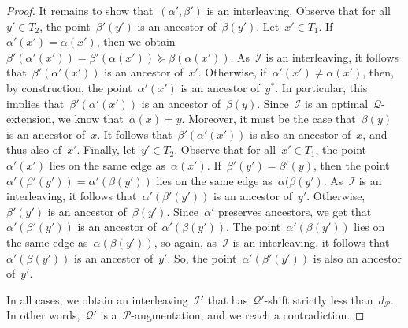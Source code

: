 \documentclass[a4paper,UKenglish, autoref, thm-restate, cleveref]{lipics-v2021}
\newcommand{\resdist}[1]{d_{#1}}
\newcommand{\I}{\mathcal{I}}
\renewcommand{\P}{\mathcal{P}}
\newcommand{\Q}{\mathcal{Q}}
\newcommand{\enumit}[1]{\textcolor{darkgray}{\sffamily\bfseries\upshape\mathversion{bold}#1}}
\begin{document}
\begin{proof}
    It remains to show that~$(\alpha',\beta')$ is an interleaving.
    Observe that for all~$y' \in T_2$, the point~$\beta'(y')$ is an ancestor of~$\beta(y')$. 
    Let~$x' \in T_1$.
    If~$\alpha'(x') = \alpha(x')$, then we obtain~$\beta'(\alpha'(x')) = \beta'(\alpha(x')) \succeq \beta(\alpha(x'))$.
    As~$\I$ is an interleaving, it follows that~$\beta'(\alpha'(x'))$ is an ancestor of~$x'$.
    Otherwise, if~$\alpha'(x') \neq \alpha(x')$, then, by construction, the point~$\alpha'(x')$ is an ancestor of~$y^*$.
    In particular, this implies that~$\beta'(\alpha'(x'))$ is an ancestor of~$\beta(y)$.
    Since~$\I$ is an optimal~$\Q$-extension, we know that~$\alpha(x) = y$.
    Moreover, it must be the case that~$\beta(y)$ is an ancestor of~$x$.
    It follows that~$\beta'(\alpha'(x'))$ is also an ancestor of~$x$, and thus also of~$x'$.    
    Finally, let~$y' \in T_2$.
    Observe that for all~$x' \in T_1$, the point~$\alpha'(x')$ lies on the same edge as~$\alpha(x')$.
    If~$\beta'(y') = \beta'(y)$, then the point~$\alpha'(\beta'(y')) = \alpha'(\beta(y'))$ lies on the same edge as~$\alpha(\beta(y')$.
    As~$\I$ is an interleaving, it follows that~$\alpha'(\beta'(y'))$ is an ancestor of~$y'$.
    Otherwise,~$\beta'(y')$ is an ancestor of~$\beta(y')$.
    Since~$\alpha'$ preserves ancestors, we get that~$\alpha'(\beta'(y'))$ is an ancestor of~$\alpha'(\beta(y'))$.
    The point~$\alpha'(\beta(y'))$ lies on the same edge as~$\alpha(\beta(y'))$, so again, as~$\I$ is an interleaving, it follows that~$\alpha'(\beta(y'))$ is an ancestor of~$y'$.
    So, the point~$\alpha'(\beta'(y'))$ is also an ancestor of~$y'$.


    In all cases, we obtain an interleaving~$\I'$ that has~$\Q'$-shift strictly less than~$\resdist{\P}$.
    In other words,~$\Q'$ is a~$\P$-augmentation, and we reach a contradiction.
\end{proof}
\end{document}
